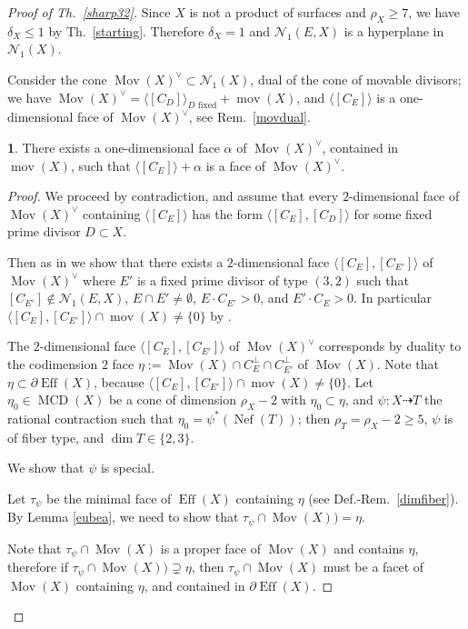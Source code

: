 \documentclass[a4paper,12pt]{amsart}
\theoremstyle{definition}
\newtheorem{prg}[thm]{}
\numberwithin{figure}{section}
\numberwithin{table}{section}
\newcommand{\N}{\mathcal{N}_1}
\newcommand{\Eff}{\operatorname{Eff}}
\newcommand{\Nef}{\operatorname{Nef}}
\newcommand{\Mov}{\operatorname{Mov}}
\newcommand{\MCD}{\operatorname{MCD}}
\newcommand{\mov}{\operatorname{mov}}
\begin{document}
\begin{proof}[Proof of Th.~\ref{sharp32}]
Since $X$ is not a product of surfaces and $\rho_X\geq 7$, we have $\delta_X\leq 1$ by Th.~\ref{starting}. Therefore
$\delta_X=1$ and $\N(E,X)$ is a hyperplane in $\N(X)$.

  Consider the cone $\Mov(X)^{\vee}\subset\N(X)$, dual of the cone of movable divisors;  we have 
 $\Mov(X)^{\vee}=\langle [C_D]\rangle_{D\text{ fixed}}+\mov(X)$,
 and $\langle[C_E]\rangle$ is a one-dimensional face of $\Mov(X)^{\vee}$, see Rem.~\ref{movdual}.
\begin{prg}\label{6.3}
 There exists a one-dimensional face $\alpha$ of $\Mov(X)^{\vee}$,  contained in $\mov(X)$, such that 
 $\langle[C_E]\rangle+\alpha$ is a face of $\Mov(X)^{\vee}$.
\end{prg}
\begin{proof}
  We proceed by contradiction, and assume that every $2$-dimensional face of 
  $\Mov(X)^{\vee}$ containing $\langle[C_E]\rangle$ has the form
  $\langle[C_E],[C_D]\rangle$ for some fixed prime divisor $D\subset X$. 

  Then
  as in \cite[proof of Prop.~5.32]{blowup} we show that there exists a
 $2$-dimensional face  $\langle[C_E],[C_{E'}]\rangle$ of 
  $\Mov(X)^{\vee}$ where $E'$ is a
  fixed prime divisor of type $(3,2)$ such that  $[C_{E'}]\not\in\N(E,X)$, $E\cap E'\neq\emptyset$, $E\cdot C_{E'}>0$, and $E'\cdot C_{E}>0$. In particular $\langle [C_{E}],[C_{E'}]\rangle\cap\mov(X)\neq\{0\}$ by \cite[Lemma 4.6(a)]{fibrations}.

The $2$-dimensional face  $\langle[C_E],[C_{E'}]\rangle$ of 
$\Mov(X)^{\vee}$ corresponds by duality to the codimension $2$ face
 $\eta:=\Mov(X)\cap C_{E}^{\perp}\cap C_{E'}^{\perp}$
of $\Mov(X)$. Note that $\eta\subset\partial \Eff(X)$, because $\langle [C_{E}],[C_{E'}]\rangle\cap\mov(X)\neq\{0\}$. Let $\eta_0\in\MCD(X)$ be a cone of dimension $\rho_X-2$ with $\eta_0\subset\eta$, and
 $\psi\colon X\dasharrow T$ the  rational contraction such that $\eta_0=\psi^*(\Nef(T))$; then  $\rho_T=\rho_X-2\geq 5$, $\psi$ is of fiber type, and $\dim T\in\{2,3\}$. 

\medskip
 
    We show that $\psi$ is special.
    
    Let $\tau_{\psi}$ be the minimal face of $\Eff(X)$ containing $\eta$ (see Def.-Rem.~\ref{dimfiber}). By Lemma \ref{eubea}, we need to show that 
    $\tau_{\psi}\cap\Mov(X))=\eta$.

    Note that $\tau_{\psi}\cap\Mov(X)$ is a proper face of $\Mov(X)$ and contains $\eta$, therefore if  $\tau_{\psi}\cap\Mov(X))\supsetneq\eta$, then  $\tau_{\psi}\cap\Mov(X)$ must be a facet of $\Mov(X)$ containing $\eta$, and contained in 
 $\partial \Eff(X)$.
  

\end{proof}
\end{proof}
\end{document}
